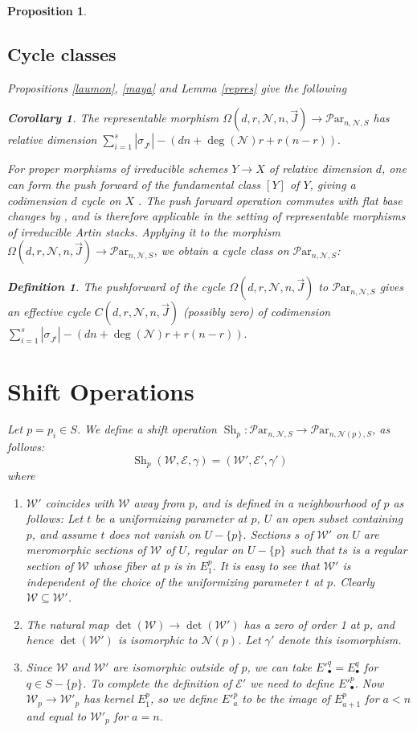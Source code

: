 \documentclass[11pt]{amsart}
\newcommand\bull{{\bullet}}
\newcommand\me{\mathcal{E}}
\newcommand\mw{\mathcal{W}}
\newcommand\mn{\mathcal{N}}
\newcommand\Par{\mathcal{P}\text{ar} }
\newtheorem{corollary}[theorem]{Corollary}
\newtheorem{proposition}[theorem]{Proposition}
\newtheorem{defi}[theorem]{Definition}
\numberwithin{theorem}{subsection}
\begin{document}
{\begin{proposition}
\subsection{Cycle classes}
Propositions \ref{laumon}, \ref{maya} and Lemma \ref{repres} give the following
\begin{corollary}
The representable morphism $\Omega(d,r,\mn,n,\vec{J})\to \Par_{n,\mn,S}$ has relative dimension
$\sum_{i=1}^s |\sigma_{J^i}| -(dn +\deg(\mn)r +r(n-r)).$
\end{corollary}
For proper morphisms of irreducible schemes $Y\to X$ of relative dimension $d$, one can form the push forward of the fundamental class $[Y]$  of $Y$, giving  a codimension $d$ cycle on $X$ \cite[Section 1.4]{FInt}. The push forward operation commutes with flat base changes by \cite[Proposition 1.7]{FInt}, and is therefore applicable in the setting of representable morphisms of irreducible Artin stacks. Applying it to the morphism $\Omega(d,r,\mn,n,\vec{J})\to \Par_{n,\mn,S}$, we obtain a cycle class on $\Par_{n,\mn,S}$:
\begin{defi}\label{cyclist}
The pushforward of the cycle $\Omega(d,r,\mn,n,\vec{J})$ to $\Par_{n,\mn,S}$ gives an effective cycle $C(d,r,\mn,n,\vec{J})$ (possibly zero) of codimension
 $\sum_{i=1}^s |\sigma_{J^i}| -(dn +\deg(\mn)r +r(n-r)).$
 \end{defi}
\section{Shift Operations}\label{shifty}
Let $p=p_i\in S$. We define a shift operation $\operatorname{Sh}_p: \Par_{n,\mn,S}\to \Par_{n,\mn(p),S}$,  as follows:
$$\operatorname{Sh}_p(\mw,\me,\gamma)=(\mw',\me',\gamma')$$
where
\begin{enumerate}
\item $\mw'$ coincides with $\mw$ away from $p$, and is defined in a neighbourhood of $p$ as follows: Let $t$ be a uniformizing parameter at $p$, $U$ an open subset containing $p$, and assume $t$ does not vanish on $U-\{p\}$. Sections $s$ of $\mw'$ on $U$ are meromorphic sections of $\mw$ of $U$, regular on $U-\{p\}$ such that $ts$ is a regular section of $\mw$
whose fiber at $p$ is in $E^p_1$. It is easy to see that $\mw'$ is independent of the choice of the uniformizing parameter $t$ at $p$. Clearly $\mw\subseteq\mw'$.
\item
The natural map $\det(\mw)\to \det(\mw')$ has a zero of order 1 at $p$, and hence $\det(\mw')$ is isomorphic to $\mn(p)$. Let $\gamma'$ denote this isomorphism.
\item Since $\mw$ and $\mw'$ are isomorphic outside of $p$, we can take $E'^{q}_{\bull}=E^q_{\bull}$ for $q\in S-\{p\}$. To complete the definition of $\me'$ we need to define $E'^p_{\bull}$.  Now $\mw_p\to \mw'_p$ has kernel $E^p_1$, so we define $E'^p_a$ to be the image of $E^p_{a+1}$ for $a<n$ and equal to  $\mw'_p$ for $a=n$.
\end{enumerate}


\end{proposition}}
\end{document}
